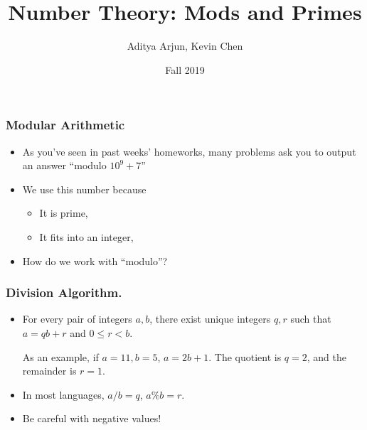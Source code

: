 \documentclass[t, handout]{beamer}
\title{Number Theory: Mods and Primes}
\author{Aditya Arjun, Kevin Chen}
\institute{CS 104C}
\date{Fall 2019}
\begin{document}
 
\frame{\titlepage}
 
\begin{frame}

    \frametitle{Modular Arithmetic}

    \begin{itemize}

        \item

        As you've seen in past weeks' homeworks, many problems ask you to output an answer ``modulo $10^9 + 7$''
        
        \item

        We use this number because
        \begin{itemize}
            \item It is prime,
            \pause
            \item It fits into an integer,
        \end{itemize}

        \item How do we work with ``modulo''?
    \end{itemize}

\end{frame}


\begin{frame}
    \frametitle{Division Algorithm.}
    \begin{itemize}
        \item For every pair of integers $a, b$, there exist unique integers $q, r$ such that $a = q b + r$ and $0 \leq r < b$.
        
        \pause

        As an example, if $a = 11, b = 5$, $a = 2 b + 1$. The quotient is $q = 2$, and the remainder is $r = 1$.
        
        \pause 
        
        \item In most languages, $a / b = q$, $a \% b = r$.
        
        \pause
        
        \item Be careful with negative values!
    \end{itemize}
\end{frame}
\end{document}
